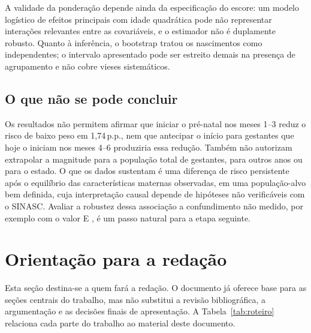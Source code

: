 \documentclass[11pt,a4paper]{article}
\newcommand{\pp}{\,p.p.}
\begin{document}
A validade da ponderação depende ainda da especificação do escore: um modelo logístico de
efeitos principais com idade quadrática pode não representar interações relevantes entre
as covariáveis, e o estimador não é duplamente robusto. Quanto à inferência, o bootstrap
tratou os nascimentos como independentes; o intervalo apresentado pode ser estreito demais
na presença de agrupamento e não cobre vieses sistemáticos.

\subsection{O que não se pode concluir}

Os resultados não permitem afirmar que iniciar o pré-natal nos meses 1--3 reduz o risco de
baixo peso em 1,74\pp, nem que antecipar o início para gestantes que hoje o iniciam nos
meses 4--6 produziria essa redução. Também não autorizam extrapolar a magnitude para a
população total de gestantes, para outros anos ou para o estado. O que os dados sustentam
é uma diferença de risco persistente após o equilíbrio das características maternas
observadas, em uma população-alvo bem definida, cuja interpretação causal depende de
hipóteses não verificáveis com o SINASC. Avaliar a robustez dessa associação a
confundimento não medido, por exemplo com o valor E \cite{vanderweele2017}, é um passo
natural para a etapa seguinte.

\section{Orientação para a redação}\label{sec:orientacao}

Esta seção destina-se a quem fará a redação. O documento já oferece base para as seções
centrais do trabalho, mas não substitui a revisão bibliográfica, a argumentação e as
decisões finais de apresentação. A Tabela~\ref{tab:roteiro} relaciona cada parte do
trabalho ao material deste documento.
\end{document}
